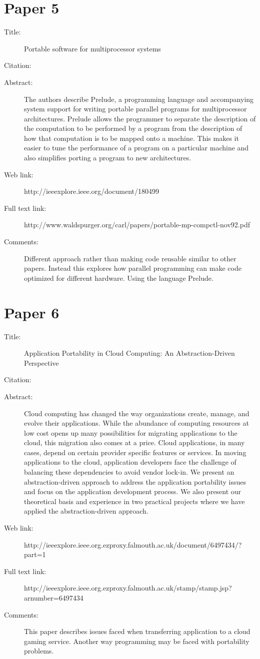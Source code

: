 \documentclass{scrartcl}
\begin{document}
\section*{Paper 5}
\begin{description}
\item[Title:] Portable software for multiprocessor systems
\item[Citation:] \cite{Colbrook}
\item[Abstract:] The authors describe Prelude, a programming language and accompanying system support for writing portable parallel programs for multiprocessor architectures. Prelude allows the programmer to separate the description of the computation to be performed by a program from the description of how that computation is to be mapped onto a machine. This makes it easier to tune the performance of a program on a particular machine and also simplifies porting a program to new architectures.
\item[Web link:] http://ieeexplore.ieee.org/document/180499
\item[Full text link:] http://www.waldspurger.org/carl/papers/portable-mp-compctl-nov92.pdf
\item[Comments:] 
Different approach rather than making code reusable similar to other papers. Instead this explores how parallel programming can make code optimized for different hardware.
Using the language Prelude.
\end{description}

\section*{Paper 6}
\begin{description}
\item[Title:] Application Portability in Cloud Computing: An Abstraction-Driven Perspective
\item[Citation:] \cite{PracticesRanabahu}
\item[Abstract:] Cloud computing has changed the way organizations create, manage, and evolve their applications. While the abundance of computing resources at low cost opens up many possibilities for migrating applications to the cloud, this migration also comes at a price. Cloud applications, in many cases, depend on certain provider specific features or services. In moving applications to the cloud, application developers face the challenge of balancing these dependencies to avoid vendor lock-in. We present an abstraction-driven approach to address the application portability issues and focus on the application development process. We also present our theoretical basis and experience in two practical projects where we have applied the abstraction-driven approach.
\item[Web link:] http://ieeexplore.ieee.org.ezproxy.falmouth.ac.uk/document/6497434/?part=1
\item[Full text link:] http://ieeexplore.ieee.org.ezproxy.falmouth.ac.uk/stamp/stamp.jsp?arnumber=6497434
\item[Comments:] 
This paper describes issues faced when transferring application to a cloud gaming service. Another way programming may be faced with portability problems.
\end{description}
\end{document}
